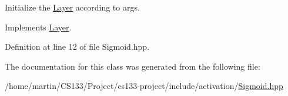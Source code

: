 Initialize the \hyperlink{class_layer}{Layer} according to args. 



Implements \hyperlink{class_layer_aab662b9c8e61cd7375cbb4413d2e3037}{Layer}.



Definition at line 12 of file Sigmoid.\+hpp.



The documentation for this class was generated from the following file\+:\begin{DoxyCompactItemize}
\item 
/home/martin/\+C\+S133/\+Project/cs133-\/project/include/activation/\hyperlink{sigmoid_8hpp}{Sigmoid.\+hpp}\end{DoxyCompactItemize}
